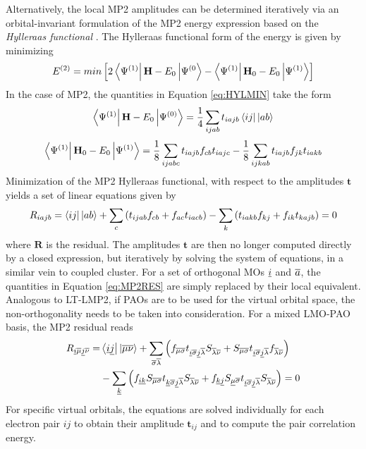 Alternatively, the local MP2 amplitudes can be determined iteratively via an orbital-invariant formulation of the MP2 energy expression based on the \emph{Hylleraas functional} \cite{Hyl1929,Pul1986}. The  Hylleraas functional form of the energy is given by minimizing 
\begin{equation}
E^{(2)} = min \left[ 2\bra{\Psi^{(1)}} \mathbf{H} - E_0  \ket{\Psi^{(0}} - \bra{\Psi^{(1)}} \mathbf{H}_0 - E_0 \ket{\Psi^{(1)}} \right]
\label{eq:HYLMIN}
\end{equation}
\noindent In the case of MP2, the quantities in Equation \ref{eq:HYLMIN} take the form
\begin{equation}
\bra{\Psi^{(1)}} \mathbf{H} - E_0  \ket{\Psi^{(0)}} = \frac{1}{4} \sum_{ijab} t_{iajb} \sbra{ij}\sket{ab}
\end{equation}
\begin{equation}
\bra{\Psi^{(1)}} \mathbf{H}_0 - E_0 \ket{\Psi^{(1)}} = \frac{1}{8} \sum_{ijabc} t_{iajb} f_{cb} t_{iajc} - \frac{1}{8} \sum_{ijkab} t_{iajb} f_{jk} t_{iakb}
\end{equation}
\noindent Minimization of the MP2 Hylleraas functional, with respect to the amplitudes $\mathbf{t}$ yields a set of linear equations given by
\begin{equation}
\begin{split}
R_{iajb} = \bra{ij} {} \ket{ab} + \sum_c \left(t_{ijab} f_{cb} + f_{ac} t_{iacb} \right) - \sum_k \left( t_{iakb} f_{kj} + f_{ik} t_{kajb} \right) = 0
\end{split}
\label{eq:MP2RES}
\end{equation}
\noindent where $\mathbf{R}$ is the residual. The amplitudes $\mathbf{t}$ are then no longer computed directly by a closed expression, but iteratively by solving the system of equations, in a similar vein to coupled cluster. %
For a set of orthogonal MOs $\underline{i}$ and $\overline{a}$, the quantities in Equation \ref{eq:MP2RES} are simply replaced by their local equivalent. Analogous to LT-LMP2, if PAOs are to be used for the virtual orbital space, the non-orthogonality needs to be taken into consideration. For a mixed LMO-PAO basis, the MP2 residual reads
\begin{equation}
\begin{split}
R_{\underline{i} \overline{\mu} \underline{j} \overline{\nu}} = & \bra{\underline{i}\underline{j}}{}\ket{\overline{\mu}\overline{\nu}} + \sum_{\overline{\sigma}\overline{\lambda}} \left( f_{\overline{\mu}\overline{\sigma}} t_{\underline{i} \overline{\sigma} \underline{j} \overline{\lambda}} S_{\overline{\lambda}\overline{\nu}} + S_{\overline{\mu}\overline{\sigma}} t_{\underline{i} \overline{\sigma} \underline{j} \overline{\lambda}} f_{\overline{\lambda}\overline{\nu}} \right) \\
&-  \sum_{\underline{k}} \left( f_{\underline{i} \underline{k}} S_{\overline{\mu}\overline{\sigma}} t_{\underline{k} \overline{\sigma} \underline{j} \overline{\lambda}} S_{\overline{\lambda} \overline{\nu}} + f_{\underline{k} \underline{j}} S_{\underline{\mu}\overline{\sigma}} t_{\underline{i} \overline{\sigma} \underline{j} \overline{\lambda}} S_{\overline{\lambda}\overline{\nu}} \right) = 0
\end{split} 
\end{equation}
\noindent For specific virtual orbitals, the equations are solved individually for each electron pair $ij$ to obtain their amplitude $\mathbf{t}_{ij}$ and to compute the pair correlation energy. 

